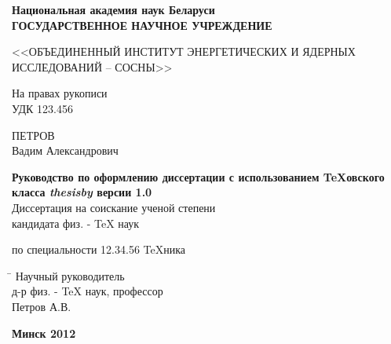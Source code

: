 \begin{titlepage}

\begin{center} \bfseries
 Национальная академия наук Беларуси\\
\bigskip
{ГОСУДАРСТВЕННОЕ НАУЧНОЕ УЧРЕЖДЕНИЕ}
\medskip

{<<ОБЪЕДИНЕННЫЙ ИНСТИТУТ ЭНЕРГЕТИЧЕСКИХ
И ЯДЕРНЫХ ИССЛЕДОВАНИЙ – СОСНЫ>>}
\end{center}
\medskip

\noindent На правах рукописи\\
УДК  123.456 \\
\vspace{1cm}

\begin{center}
{\large ПЕТРОВ \\ Вадим Александрович}\\ \vspace{1cm}

{\bfseries Руководство по оформлению диссертации с использованием \TeX овского класса {\itshape thesisby} версии 1.0}\\
\vspace{2cm}
Диссертация на соискание ученой степени\\
кандидата физ. - \TeX{} наук\\
\medskip

по специальности 12.34.56 \TeX ника 
\end{center}
\vspace{3cm}

\begin{tabbing}
\hspace{8cm} \= \kill \>
Научный руководитель \+ \\
д-р физ. - \TeX{} наук, профессор\\
Петров А.В.
\end{tabbing}
\vspace{5cm}

\begin{center}
 \bfseries Минск 2012
\end{center}

\end{titlepage}
